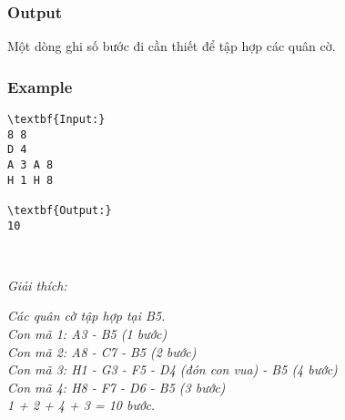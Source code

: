 \subsubsection{Output}

Một dòng ghi số bước đi cần thiết để tập hợp các quân cờ.

\subsubsection{Example}
\begin{verbatim}
\textbf{Input:}
8 8
D 4
A 3 A 8
H 1 H 8

\textbf{Output:}
10\end{verbatim}

 

\emph{Giải thích: }

\emph{Các quân cờ tập hợp tại B5.
\\Con mã 1: A3 - B5 (1 bước)
\\Con mã 2: A8 - C7 - B5 (2 bước)
\\Con mã 3: H1 - G3 - F5 - D4 (đón con vua) - B5 (4 bước)
\\Con mã 4: H8 - F7 - D6 - B5 (3 bước)
\\1 + 2 + 4 + 3 = 10 bước. }